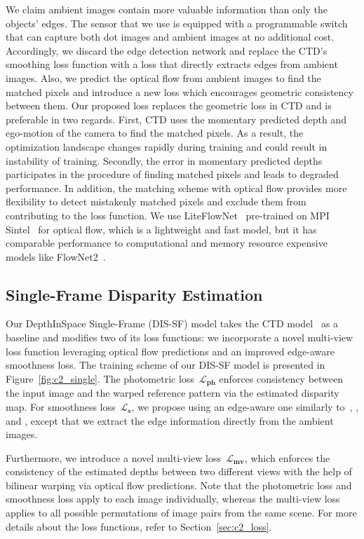 We claim ambient images contain more valuable information than only the objects' edges. The sensor that we use is equipped with a programmable switch that can capture both dot images and ambient images at no additional cost. Accordingly, we discard the edge detection network and replace the CTD's smoothing loss function with a loss that directly extracts edges from ambient images. Also, we predict the optical flow from ambient images to find the matched pixels and introduce a new loss which encourages geometric consistency between them. Our proposed loss replaces the geometric loss in CTD and is preferable in two regards. First, CTD uses the momentary predicted depth and ego-motion of the camera to find the matched pixels. As a result, the optimization landscape changes rapidly during training and could result in instability of training. Secondly, the error in momentary predicted depths participates in the procedure of finding matched pixels and leads to degraded performance. In addition, the matching scheme with optical flow provides more flexibility to detect mistakenly matched pixels and exclude them from contributing to the loss function. We use LiteFlowNet~\citep{hui2018liteflownet} pre-trained on MPI Sintel~\citep{butler2012naturalistic} for optical flow, which is a lightweight and fast model, but it has comparable performance to computational and memory resource expensive models like FlowNet2~\citep{ilg2017flownet}.

\subsection{Single-Frame Disparity Estimation} \label{sec:c2_single-frame}

Our DepthInSpace Single-Frame (DIS-SF) model takes the CTD model~\citep{riegler2019connecting} as a baseline and modifies two of its loss functions: we incorporate a novel multi-view loss function leveraging optical flow predictions and an improved edge-aware smoothness loss. The training scheme of our DIS-SF model is presented in Figure~\ref{fig:c2_single}. The photometric loss~$\boldsymbol{\mathcal{L}_{ph}}$ enforces consistency between the input image and the warped reference pattern via the estimated disparity map. For smoothness loss~$\boldsymbol{\mathcal{L}_{s}}$, we propose using an edge-aware one similarly to~\cite{godard2017unsupervised}, \cite{godard2019digging}, and \cite{pillai2019superdepth}, except that we extract the edge information directly from the ambient images.

Furthermore, we introduce a novel multi-view loss~$\boldsymbol{\mathcal{L}_{mv}}$, which enforces the consistency of the estimated depths between two different views with the help of bilinear warping via optical flow predictions. Note that the photometric loss and smoothness loss apply to each image individually, whereas the multi-view loss applies to all possible permutations of image pairs from the same scene. For more details about the loss functions, refer to Section~\ref{sec:c2_loss}.

